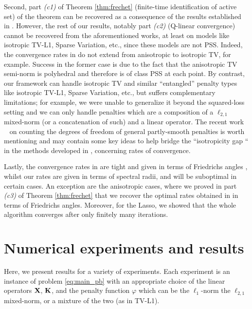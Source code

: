 Second, part \textit{(c1)} of Theorem \ref{thm:frechet} (finite-time
identification of active set) of the theorem can be recovered as a
consequence of the results established in
\citep{liang2014activity,liang2015activity}. However, the rest of our
results, notably part \textit{(c2)} (Q-linear convergence) cannot be
recovered from the aforementioned works, at least on models like
isotropic TV-L1, Sparse Variation, etc., since these models are not
PSS. Indeed, the convergence rates in
\citep{liang2014activity,liang2015activity} do not extend from
anisotropic to isotropic TV, for example. Success in the former case
is due to the fact that the anisotropic TV semi-norm is polyhedral
and therefore is of class PSS at each point. By contrast, our framework
can handle isotropic TV and similar ``entangled'' penalty types like
isotropic TV-L1, Sparse Variation, etc., but suffers complementary
limitations; for example, 
we were unable to generalize it
beyond the squared-loss setting and we can only handle penalties which
are a composition of a $\ell_{2,1}$ mixed-norm (or a concatenation of
such)  and a linear operator. The recent work ~\citep{vaiter2016degrees} on counting the degrees of freedom of general partly-smooth penalties is worth mentioning and may contain some key ideas to help bridge the ``isotropicity gap `` in the methods developed in \citep{liang2014activity,liang2015activity}, concerning rates of convergence.

Lastly, the convergence rates in
\citep{liang2014activity,liang2015activity}
are tight and given in terms of Friedrichs angles
\citep{bauschke2014optimal}, whilst our rates
are given in terms of spectral radii, and will be
suboptimal in certain cases. An exception are the anisotropic cases,
where we proved in part \textit{(c3)} of Theorem \ref{thm:frechet} that
we recover the optimal rates obtained in
\citep{liang2014activity,liang2015activity} in terms of Friedrichs
angles. Moreover, for the Lasso, we showed that the whole algorithm
converges after only finitely many iterations.

\section{Numerical experiments and results}
\label{sec:exp}
Here, we present results for a variety of experiments. Each experiment
is an instance of problem \eqref{eq:main_pb} with an
appropriate choice of the linear operators $\mathbf{X}$, $\mathbf{K}$,  and the penalty
function $\varphi$ which can be the $\ell_1$-norm the
$\ell_{2,1}$ mixed-norm, or a mixture of the two (as in TV-L1).

